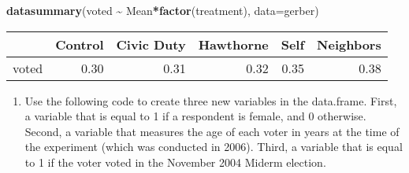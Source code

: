 \documentclass[
]{article}
\newenvironment{Shaded}{\begin{snugshade}}{\end{snugshade}}
\newcommand{\AttributeTok}[1]{\textcolor[rgb]{0.13,0.29,0.53}{#1}}
\newcommand{\DecValTok}[1]{\textcolor[rgb]{0.00,0.00,0.81}{#1}}
\newcommand{\DocumentationTok}[1]{\textcolor[rgb]{0.56,0.35,0.01}{\textbf{\textit{#1}}}}
\newcommand{\FunctionTok}[1]{\textcolor[rgb]{0.13,0.29,0.53}{\textbf{#1}}}
\newcommand{\NormalTok}[1]{#1}
\newcommand{\OtherTok}[1]{\textcolor[rgb]{0.56,0.35,0.01}{#1}}
\newcommand{\SpecialCharTok}[1]{\textcolor[rgb]{0.81,0.36,0.00}{\textbf{#1}}}
\newcommand{\StringTok}[1]{\textcolor[rgb]{0.31,0.60,0.02}{#1}}
\providecommand{\tightlist}{%
  \setlength{\itemsep}{0pt}\setlength{\parskip}{0pt}}
\begin{document}
\begin{Shaded}
\begin{Highlighting}[]
\FunctionTok{datasummary}\NormalTok{(voted }\SpecialCharTok{\textasciitilde{}}\NormalTok{ Mean}\SpecialCharTok{*}\FunctionTok{factor}\NormalTok{(treatment), }\AttributeTok{data=}\NormalTok{gerber)}
\end{Highlighting}
\end{Shaded}

\begin{table}
\centering
\begin{tabular}[t]{lrrrrr}
\toprule
  & Control & Civic Duty & Hawthorne & Self & Neighbors\\
\midrule
voted & \num{0.30} & \num{0.31} & \num{0.32} & \num{0.35} & \num{0.38}\\
\bottomrule
\end{tabular}
\end{table}

\begin{enumerate}
\def\labelenumi{\arabic{enumi}.}
\setcounter{enumi}{1}
\tightlist
\item
  Use the following code to create three new variables in the
  data.frame. First, a variable that is equal to 1 if a respondent is
  female, and 0 otherwise. Second, a variable that measures the age of
  each voter in years at the time of the experiment (which was conducted
  in 2006). Third, a variable that is equal to 1 if the voter voted in
  the November 2004 Miderm election.
\end{enumerate}

\begin{Shaded}
\end{Shaded}
\end{document}
